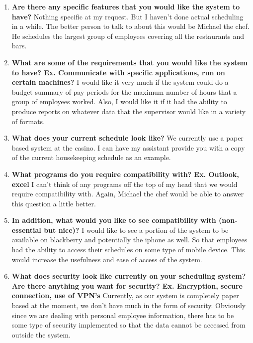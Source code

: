 \documentclass[letterpaper,12pt]{report}
\begin{document}
\begin{enumerate}
\pagebreak

 \item \textbf{Are there any specific features that you would like the system to have?}\newline
 Nothing specific at my request. But I haven’t done actual scheduling in a while. The better person to talk to about this would be Michael the chef. He schedules the largest group of employees covering all the restaurants and bars.
 \item \textbf{What are some of the requirements that you would like the system to have? Ex. Communicate with specific applications, run on certain machines?}\newline
 I would like it very much if the system could do a budget summary of pay periods for the maximum number of hours that a group of employees worked. Also, I would like it if it had the ability to produce reports on whatever data that the supervisor would like in a variety of formats. 
 \item \textbf{What does your current schedule look like?}\newline
 We currently use a paper based system at the casino. I can have my assistant provide you with a copy of the current housekeeping schedule as an example.
 \item \textbf{What programs do you require compatibility with? Ex. Outlook, excel}\newline
 I can’t think of any programs off the top of my head that we would require compatibility with. Again, Michael the chef would be able to answer this question a little better.
 \item \textbf{In addition, what would you like to see compatibility with (non-essential but nice)?}\newline
 I would like to see a portion of the system to be available on blackberry and potentially the iphone as well. So that employees had the ability to access their schedules on some type of mobile device. This would increase the usefulness and ease of access of the system.
 \item \textbf{What does security look like currently on your scheduling system? Are there anything you want for security? Ex. Encryption, secure connection, use of VPN’s}\newline
 Currently, as our system is completely paper based at the moment, we don’t have much in the form of security. Obviously since we are dealing with personal employee information, there has to be some type of security implemented so that the data cannot be accessed from outside the system.

\end{enumerate}
\end{document}
